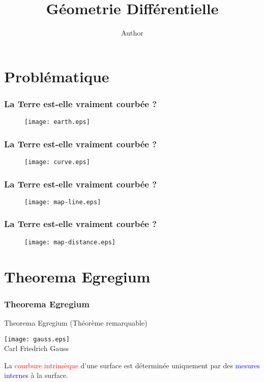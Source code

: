\documentclass{beamer}
\title{Géometrie Différentielle}
\author{Author}
\newcommand{\red}[1]{\textcolor{red}{#1}}
\newcommand{\blue}[1]{\textcolor{blue}{#1}}
\begin{document}
\frame{\maketitle}


\section{Problématique} 
\begin{frame}
  \frametitle{La Terre est-elle vraiment courbée ?}
  \begin{figure}
    \centering
    \texttt{[image: earth.eps]}
  \end{figure}
\end{frame}
\begin{frame}
  \frametitle{La Terre est-elle vraiment courbée ?}
  \begin{figure}
    \centering
    \texttt{[image: curve.eps]}
  \end{figure}
\end{frame}
\begin{frame}
  \frametitle{La Terre est-elle vraiment courbée ?}
  \begin{figure}
    \centering
    \texttt{[image: map-line.eps]}
  \end{figure}
\end{frame}
\begin{frame}
  \frametitle{La Terre est-elle vraiment courbée ?}
  \begin{figure}
    \centering
    \texttt{[image: map-distance.eps]}
  \end{figure}
\end{frame}

\section{Theorema Egregium}
\begin{frame}
  \frametitle{Theorema Egregium}
  Theorema Egregium (Théorème remarquable)
  \vskip5mm
  \begin{minipage}{0.4\linewidth}
    \texttt{[image: gauss.eps]} \\
    Carl Friedrich Gauss
  \end{minipage}
  \begin{minipage}{0.55\linewidth}
    \vspace{-1cm}
    La \red{courbure intrinsèque} d'une surface est déterminée uniquement par des \blue{mesures internes} à la surface.
  \end{minipage}
\end{frame}
\end{document}

